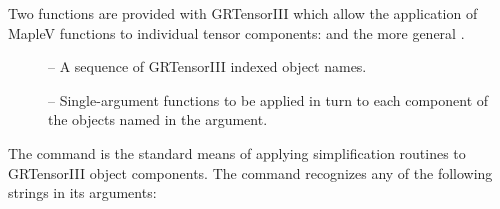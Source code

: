 \documentclass{article}
\begin{document}
{{{Two functions are provided with GRTensorIII which allow the application
of MapleV functions to individual tensor components: 
and the more general .\\
%
\begin{cmdspec}
  \label{spec:gralter}

  \begin{description}
    \item[] -- A sequence of GRTensorIII indexed object names.
    \item[] -- Single-argument functions to be applied in
      turn to each component of the objects named in the 
      argument.
  \end{description}

\end{cmdspec}

The  command is the standard means of applying simplification
routines to GRTensorIII object components. The command recognizes any of
the following strings in its  arguments:

}}}
\end{document}
